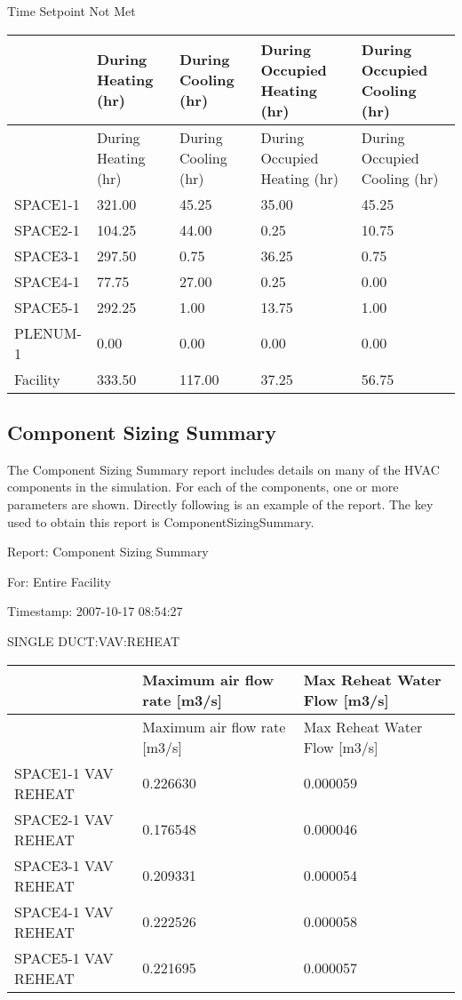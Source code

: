 Time Setpoint Not Met

\begin{longtable}[c]{>{\raggedright}p{1.2in}>{\raggedright}p{1.2in}>{\raggedright}p{1.2in}>{\raggedright}p{1.2in}>{\raggedright}p{1.2in}}
\toprule 
~ & During Heating (hr) & During Cooling (hr) & During Occupied Heating (hr) & During Occupied Cooling (hr) \tabularnewline
\midrule
\endfirsthead

\toprule 
~ & During Heating (hr) & During Cooling (hr) & During Occupied Heating (hr) & During Occupied Cooling (hr) \tabularnewline
\midrule
\endhead

SPACE1-1 & 321.00 & 45.25 & 35.00 & 45.25 \tabularnewline
SPACE2-1 & 104.25 & 44.00 & 0.25 & 10.75 \tabularnewline
SPACE3-1 & 297.50 & 0.75 & 36.25 & 0.75 \tabularnewline
SPACE4-1 & 77.75 & 27.00 & 0.25 & 0.00 \tabularnewline
SPACE5-1 & 292.25 & 1.00 & 13.75 & 1.00 \tabularnewline
PLENUM-1 & 0.00 & 0.00 & 0.00 & 0.00 \tabularnewline
Facility & 333.50 & 117.00 & 37.25 & 56.75 \tabularnewline
\bottomrule
\end{longtable}

\subsection{Component Sizing Summary}\label{component-sizing-summary}

The Component Sizing Summary report includes details on many of the HVAC components in the simulation. For each of the components, one or more parameters are shown. Directly following is an example of the report. The key used to obtain this report is ComponentSizingSummary.

Report: Component Sizing Summary

For: Entire Facility

Timestamp: 2007-10-17 08:54:27

SINGLE DUCT:VAV:REHEAT

\begin{longtable}[c]{>{\raggedright}p{1.52in}>{\raggedright}p{2.24in}>{\raggedright}p{2.24in}}
\toprule 
~ & Maximum air flow rate [m3/s] & Max Reheat Water Flow [m3/s] \tabularnewline
\midrule
\endfirsthead

\toprule 
~ & Maximum air flow rate [m3/s] & Max Reheat Water Flow [m3/s] \tabularnewline
\midrule
\endhead

SPACE1-1 VAV REHEAT & 0.226630 & 0.000059 \tabularnewline
SPACE2-1 VAV REHEAT & 0.176548 & 0.000046 \tabularnewline
SPACE3-1 VAV REHEAT & 0.209331 & 0.000054 \tabularnewline
SPACE4-1 VAV REHEAT & 0.222526 & 0.000058 \tabularnewline
SPACE5-1 VAV REHEAT & 0.221695 & 0.000057 \tabularnewline
\bottomrule
\end{longtable}

